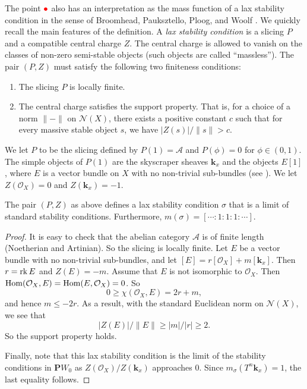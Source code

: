 \documentclass{amsart}
\begin{document}
The point \(\textcolor{red}{\bullet}\) also has an interpretation as the mass function of a lax stability condition in the sense of Broomhead, Pauksztello, Ploog, and Woolf \cite{bro.pau.plo.ea:22}.
We quickly recall the main features of the definition.
A \emph{lax stability condition} is a slicing \(P\) and a compatible central charge \(Z\).
The central charge is allowed to vanish on the classes of non-zero semi-stable objects (such objects are called ``massless'').
The pair \((P,Z)\) must satisfy the following two finiteness conditions:
\begin{enumerate}
\item The slicing \(P\) is locally finite.
\item The central charge satisfies the support property.
  That is, for a choice of a norm \(\|-\|\) on \(\mathcal{N}(X)\), there exists a positive constant \(c\) such that for every massive stable object \(s\), we have \(|Z(s)|/\|s\| > c\).
\end{enumerate}
We let \(P\) to be the slicing defined by \(P(1) = \mathcal{A}\) and \(P(\phi) = 0\) for \(\phi \in (0,1)\).
The simple objects of \(P(1)\) are the skyscraper sheaves \(\mathbf{k}_x\) and the objects \(E[1]\), where \(E\) is a vector bundle on \(X\) with no non-trivial sub-bundles (see \cite[Remark~4.3 (iii)]{huy.mac.ste:08}).
We let \(Z(\mathcal{O}_X) = 0\) and \(Z(\mathbf{k}_x) = -1\).
\begin{proposition}\label{prop:red}
  The pair \((P,Z)\) as above defines a lax stability condition \(\sigma\) that is a limit of standard stability conditions.
  Furthermore, \(m(\sigma) = [\cdots : 1 : 1: 1 : \cdots]\).
\end{proposition}
\begin{proof}
  It is easy to check that the abelian category \(\mathcal{A}\) is of finite length (Noetherian and Artinian).
  So the slicing is locally finite.
  Let \(E\) be a vector bundle with no non-trivial sub-bundles, and let \([E] = r[\mathcal{O}_X] + m[\mathbf{k}_x]\).
  Then \(r = \operatorname{rk} E\) and \(Z(E) = -m\).
  Assume that \(E\) is not isomorphic to \(\mathcal{O}_X\).
  Then \(\operatorname{Hom}(\mathcal{O}_X, E) = \operatorname{Hom}(E, \mathcal{O}_X) = 0\).
  So \[0 \geq \chi(\mathcal{O}_X, E) = 2r+m,\]
  and hence \(m \leq -2r\).
  As a result, with the standard Euclidean norm on \(\mathcal{N}(X)\), we see that \[|Z(E)|/\|E\| \geq |m|/|r| \geq 2.\]
  So the support property holds.

  Finally, note that this lax stability condition is the limit of the stability conditions in \(\mathbf{P}W_0\) as \(Z(\mathcal{O}_{X})/Z(\mathbf{k}_x)\) approaches \(0\).
  Since \(m_{\sigma}(T^n \mathbf{k}_x) = 1\), the last equality follows.
\end{proof}
\end{document}
